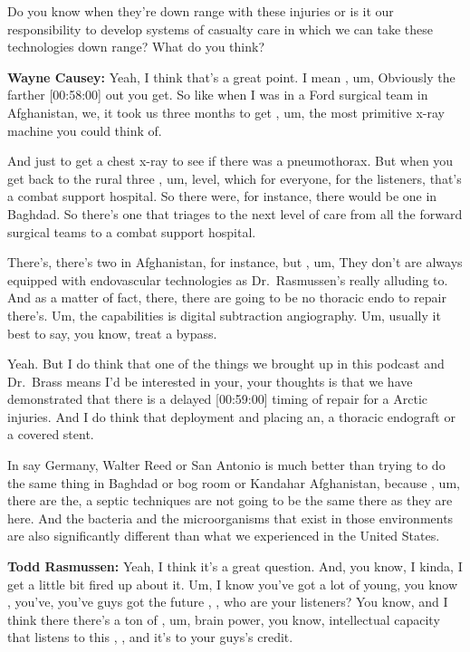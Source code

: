 \documentclass[
]{book}
\begin{document}
Do you know when they're down range with these injuries or is it our
responsibility to develop systems of casualty care in which we can take
these technologies down range? What do you think?

\textbf{Wayne Causey:} Yeah, I think that's a great point. I mean , um,
Obviously the farther {[}00:58:00{]} out you get. So like when I was in a
Ford surgical team in Afghanistan, we, it took us three months to get ,
um, the most primitive x-ray machine you could think of.

And just to get a chest x-ray to see if there was a pneumothorax. But
when you get back to the rural three , um, level, which for everyone,
for the listeners, that's a combat support hospital. So there were, for
instance, there would be one in Baghdad. So there's one that triages to
the next level of care from all the forward surgical teams to a combat
support hospital.

There's, there's two in Afghanistan, for instance, but , um, They don't
are always equipped with endovascular technologies as Dr.~Rasmussen's
really alluding to. And as a matter of fact, there, there are going to
be no thoracic endo to repair there's. Um, the capabilities is digital
subtraction angiography. Um, usually it best to say, you know, treat a
bypass.

Yeah. But I do think that one of the things we brought up in this
podcast and Dr.~Brass means I'd be interested in your, your thoughts is
that we have demonstrated that there is a delayed {[}00:59:00{]} timing of
repair for a Arctic injuries. And I do think that deployment and placing
an, a thoracic endograft or a covered stent.

In say Germany, Walter Reed or San Antonio is much better than trying to
do the same thing in Baghdad or bog room or Kandahar Afghanistan,
because , um, there are the, a septic techniques are not going to be the
same there as they are here. And the bacteria and the microorganisms
that exist in those environments are also significantly different than
what we experienced in the United States.

\textbf{Todd Rasmussen:} Yeah, I think it's a great question. And, you know,
I kinda, I get a little bit fired up about it. Um, I know you've got a
lot of young, you know , you've, you've guys got the future , , who are
your listeners? You know, and I think there there's a ton of , um, brain
power, you know, intellectual capacity that listens to this , , and it's
to your guys's credit.
\end{document}
